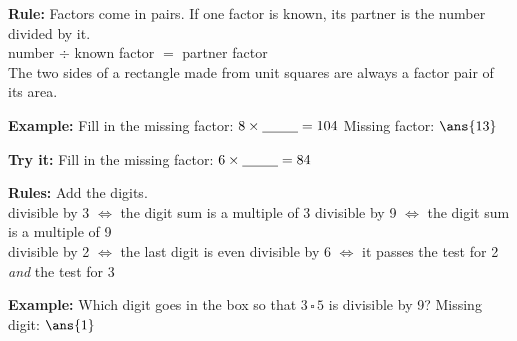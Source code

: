 \documentclass[12pt]{article}
\begin{document}


\begin{formulabox}
\textbf{Rule:} Factors come in pairs. If one factor is known, its partner is the number divided by it.\\[3pt]
number $\div$ known factor $=$ partner factor\\[3pt]
The two sides of a rectangle made from unit squares are always a factor pair of its area.
\end{formulabox}

\begin{examplebox}
\textbf{Example:} \quad Fill in the missing factor: $8 \times \underline{\hspace{0.9cm}} = 104$
Missing factor: $\ans{13}$
\end{examplebox}

\begin{tryitbox}
\textbf{Try it:} \quad Fill in the missing factor: $6 \times \underline{\hspace{0.9cm}} = 84$\\[2pt]
\end{tryitbox}


\begin{formulabox}
\textbf{Rules:} Add the digits.\\[3pt]
divisible by 3 $\Leftrightarrow$ the digit sum is a multiple of 3 \qquad divisible by 9 $\Leftrightarrow$ the digit sum is a multiple of 9\\[3pt]
divisible by 2 $\Leftrightarrow$ the last digit is even \qquad divisible by 6 $\Leftrightarrow$ it passes the test for 2 \emph{and} the test for 3
\end{formulabox}

\begin{examplebox}
\textbf{Example:} \quad Which digit goes in the box so that $3\,\square\,5$ is divisible by 9?
Missing digit: $\ans{1}$
\end{examplebox}
\end{document}
